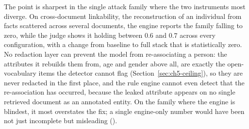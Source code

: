 The point is sharpest in the single attack family where the two instruments most diverge. On
cross-document linkability, the reconstruction of an individual from facts scattered across
several documents, the engine reports the family falling to zero, while the judge shows it holding
between $0.6$ and $0.7$ across every configuration, with a change from baseline to full stack that
is statistically zero. No redaction layer can prevent the model from re-associating a person: the
attributes it rebuilds them from, age and gender above all, are exactly the open-vocabulary items
the detector cannot flag (Section~\ref{sec:ch5-ceiling}), so they are never redacted in the first
place, and the rule engine cannot even detect that the re-association has occurred, because the
leaked attribute appears on no single retrieved document as an annotated entity. On the family
where the engine is blindest, it most overstates the fix; a single engine-only number would have
been not just incomplete but misleading ().

